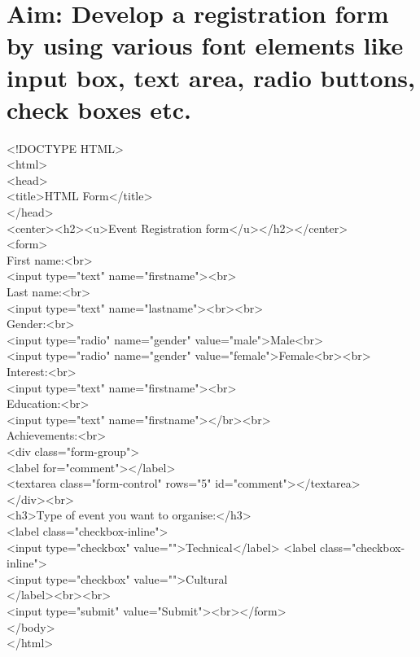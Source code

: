 \section*{\fontsize{16}{14}\selectfont Aim: Develop a registration form by using various font elements like input box, text area, radio buttons, check boxes etc.}
<!DOCTYPE HTML>\\
<html>\\
<head>\\
<title>HTML Form</title>\\
</head>\\
<center><h2><u>Event Registration form</u></h2></center>\\
<form>\\
First name:<br>\\
<input type="text" name="firstname"><br>\\
Last name:<br>\\
<input type="text" name="lastname"><br><br>\\
Gender:<br>\\
<input type="radio" name="gender" value="male">Male<br>\\
<input type="radio" name="gender" value="female">Female<br><br>\\
Interest:<br>\\
<input type="text" name="firstname"><br>\\
Education:<br>\\
<input type="text" name="firstname"></br><br>\\
Achievements:<br>\\
<div class="form-group">\\
<label for="comment"></label>\\
<textarea class="form-control" rows="5" id="comment"></textarea>\\
</div><br>\\
<h3>Type of event you want to organise:</h3>\\
<label class="checkbox-inline">\\
<input type="checkbox" value="">Technical</label>
<label class="checkbox-inline">\\
<input type="checkbox" value="">Cultural\\
</label><br><br>\\
<input type="submit" value="Submit"><br></form>\\
</body>\\
</html>

